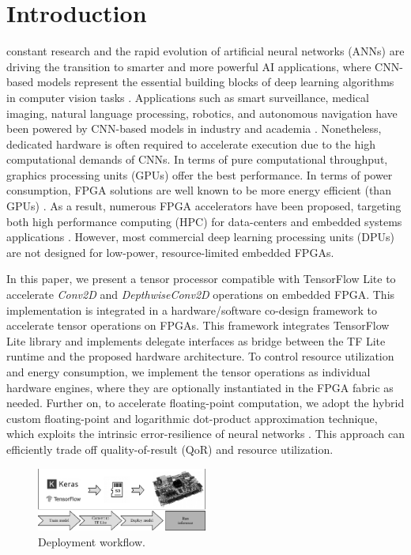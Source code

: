
\section{Introduction}
\label{sec:introduction}
 constant research and the rapid evolution of artificial neural networks (ANNs) are driving the transition to smarter and more powerful AI applications, where CNN-based models represent the essential building blocks of deep learning algorithms in computer vision tasks \cite{hassaballah2020deep}. Applications such as smart surveillance, medical imaging, natural language processing, robotics, and autonomous navigation have been powered by CNN-based models in industry and academia \cite{dhillon2020convolutional}. Nonetheless, dedicated hardware is often required to accelerate execution due to the high computational demands of CNNs. In terms of pure computational throughput, graphics processing units (GPUs) offer the best performance. In terms of power consumption, FPGA solutions are well known to be more energy efficient (than GPUs) \cite{nurvitadhi2017can}. As a result, numerous FPGA accelerators have been proposed, targeting both high performance computing (HPC) for data-centers and embedded systems applications \cite{abdelouahab2018accelerating, guo2017angel}. However, most commercial deep learning processing units (DPUs) are not designed for low-power, resource-limited embedded FPGAs.

In this paper, we present a tensor processor compatible with TensorFlow Lite to accelerate \emph{Conv2D} and \emph{DepthwiseConv2D} operations on embedded FPGA. This implementation is integrated in a hardware/software co-design framework to accelerate tensor operations on FPGAs. This framework integrates TensorFlow Lite library and implements delegate interfaces\cite{TensorFlowDelegate} as bridge between the TF Lite runtime and the proposed hardware architecture. To control resource utilization and energy consumption, we implement the tensor operations as individual hardware engines, where they are optionally instantiated in the FPGA fabric as needed. Further on, to accelerate floating-point computation, we adopt the hybrid custom floating-point and logarithmic dot-product approximation technique\cite{nevarez2021accelerating}, which exploits the intrinsic error-resilience of neural networks \cite{venkataramani2015approximate}. This approach can efficiently trade off quality-of-result (QoR) and resource utilization.

\begin{figure}[t!]
	\centering
	\includegraphics[width=0.5\textwidth]{../figures/workflow.pdf}
	\caption{Deployment workflow.}
	\label{fig:workflow}
\end{figure}

